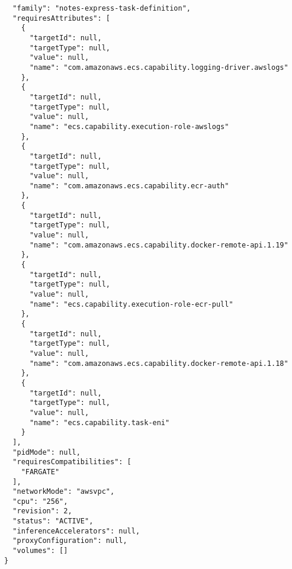 \begin{verbatim}
  "family": "notes-express-task-definition",
  "requiresAttributes": [
    {
      "targetId": null,
      "targetType": null,
      "value": null,
      "name": "com.amazonaws.ecs.capability.logging-driver.awslogs"
    },
    {
      "targetId": null,
      "targetType": null,
      "value": null,
      "name": "ecs.capability.execution-role-awslogs"
    },
    {
      "targetId": null,
      "targetType": null,
      "value": null,
      "name": "com.amazonaws.ecs.capability.ecr-auth"
    },
    {
      "targetId": null,
      "targetType": null,
      "value": null,
      "name": "com.amazonaws.ecs.capability.docker-remote-api.1.19"
    },
    {
      "targetId": null,
      "targetType": null,
      "value": null,
      "name": "ecs.capability.execution-role-ecr-pull"
    },
    {
      "targetId": null,
      "targetType": null,
      "value": null,
      "name": "com.amazonaws.ecs.capability.docker-remote-api.1.18"
    },
    {
      "targetId": null,
      "targetType": null,
      "value": null,
      "name": "ecs.capability.task-eni"
    }
  ],
  "pidMode": null,
  "requiresCompatibilities": [
    "FARGATE"
  ],
  "networkMode": "awsvpc",
  "cpu": "256",
  "revision": 2,
  "status": "ACTIVE",
  "inferenceAccelerators": null,
  "proxyConfiguration": null,
  "volumes": []
}
\end{verbatim}

